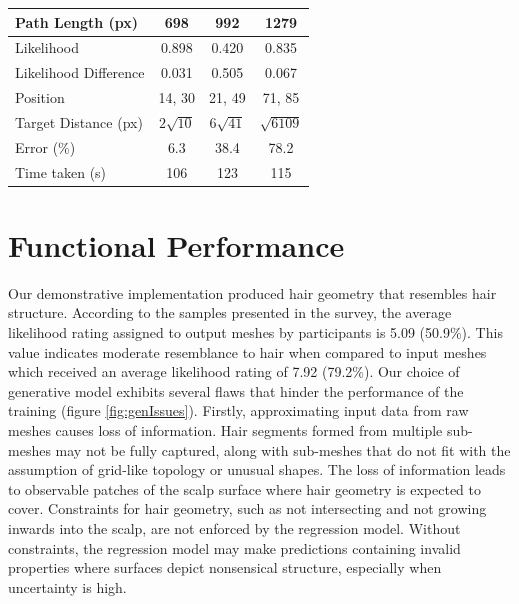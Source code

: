 \documentclass[ %
author={Dillon Keith Diep},
supervisor={Dr. Carl Henrik Ek},
degree={MEng},
title={ART-CG Hair:},
subtitle={Assisted Real-time Content Generation of Stylised Virtual Hair},
type={Research},
year={2017} ]{dissertation}
\begin{document}
\begin{table}[!h]
\begin{tabular}{|l|c|c|c|}
		\hline
		Path Length (px) & 698 & 992 & 1279\\
		\hline 
		Likelihood & 0.898 & 0.420 & 0.835\\
		\hline
		Likelihood Difference & 0.031 & 0.505 & 0.067\\
		\hline
		Position & 14, 30 & 21, 49 & 71, 85\\
		\hline
		Target Distance (px) & $2\sqrt{10}$ & $6\sqrt{41}$ & $\sqrt{6109}$\\
		\hline
		Error (\%) & 6.3 & 38.4 & 78.2\\
		\hline
		Time taken (s) & 106 & 123 & 115\\
		\hline
	\end{tabular}
	\label{nickresult}
\end{table}

\section{Functional Performance}
Our demonstrative implementation produced hair geometry that resembles hair structure. According to the samples presented in the survey, the average likelihood rating assigned to output meshes by participants is 5.09 (50.9\%). This value indicates moderate resemblance to hair when compared to input meshes which received an average likelihood rating of 7.92 (79.2\%). Our choice of generative model exhibits several flaws that hinder the performance of the training (figure \ref{fig:genIssues}). Firstly, approximating input data from raw meshes causes loss of information. Hair segments formed from multiple sub-meshes may not be fully captured, along with sub-meshes that do not fit with the assumption of grid-like topology or unusual shapes. The loss of information leads to observable patches of the scalp surface where hair geometry is expected to cover. Constraints for hair geometry, such as not intersecting and not growing inwards into the scalp, are not enforced by the regression model. Without constraints, the regression model may make predictions containing invalid properties where surfaces depict nonsensical structure, especially when uncertainty is high.
\end{document}
